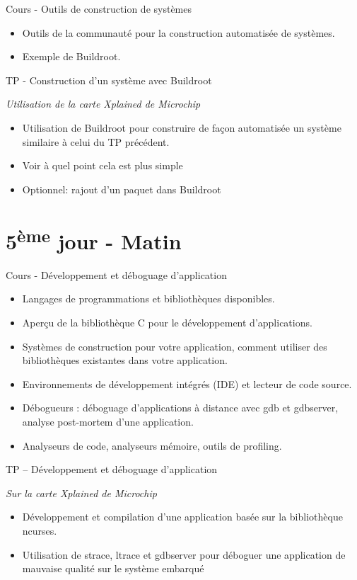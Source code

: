 \documentclass[a4paper,12pt,obeyspaces,spaces,hyphens]{article}
\begin{document}
\feagendatwocolumn
{Cours - Outils de construction de systèmes}
{
  \begin{itemize}
  \item Outils de la communauté pour la construction
	automatisée de systèmes.
  \item Exemple de Buildroot.
  \end{itemize}
}
{TP - Construction d'un système avec Buildroot}
{
  {\em Utilisation de la carte Xplained de Microchip}
  \begin{itemize}
  \item Utilisation de Buildroot pour construire de façon automatisée
	un système similaire à celui du TP précédent.
  \item Voir à quel point cela est plus simple
  \item Optionnel: rajout d'un paquet dans Buildroot
  \end{itemize}
}

\section{5\textsuperscript{ème} jour - Matin}

\feagendaonecolumn
{Cours - Développement et déboguage d'application}
{
  \begin{itemize}
  \item Langages de programmations et bibliothèques disponibles.
  \item Aperçu de la bibliothèque C pour le développement d'applications.
  \item Systèmes de construction pour votre application, comment utiliser des
	bibliothèques existantes dans votre application.
  \item Environnements de développement intégrés (IDE) et lecteur de code source.
  \item Débogueurs : déboguage d'applications à distance avec gdb et gdbserver, analyse
	post-mortem d'une application.
  \item Analyseurs de code, analyseurs mémoire, outils de profiling.
  \end{itemize}
}

\feagendaonecolumn
{TP – Développement et déboguage d'application}
{
  {\em Sur la carte Xplained de Microchip}
  \begin{itemize}
  \item Développement et compilation d'une application basée sur la bibliothèque
	ncurses.
  \item Utilisation de strace, ltrace et gdbserver pour déboguer une application de
	mauvaise qualité sur le système embarqué
  \end{itemize}
}
\end{document}
